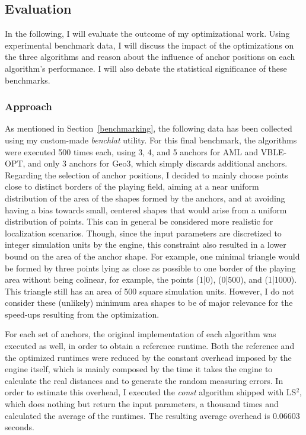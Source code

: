 \subsection{Evaluation}
\label{Evaluation}

In the following, I will evaluate the outcome of my optimizational work. Using experimental benchmark data, I will discuss the impact of the optimizations on the three algorithms and reason about the influence of anchor positions on each algorithm's performance. I will also debate the statistical significance of these benchmarks.

\subsubsection{Approach}
As mentioned in Section~\ref{benchmarking}, the following data has been collected using my custom-made \emph{benchlat} utility. For this final benchmark, the algorithms were executed 500 times each, using 3, 4, and 5 anchors for AML and VBLE-OPT, and only 3 anchors for Geo3, which simply discards additional anchors. Regarding the selection of anchor positions, I decided to mainly choose points close to distinct borders of the playing field, aiming at a near uniform distribution of the area of the shapes formed by the anchors, and at avoiding having a bias towards small, centered shapes that would arise from a uniform distribution of points. This can in general be considered more realistic for localization scenarios. Though, since the input parameters are discretized to integer simulation units by the engine, this constraint also resulted in a lower bound on the area of the anchor shape. For example, one minimal triangle would be formed by three points lying as close as possible to one border of the playing area without being colinear, for example, the points (1|0), (0|500), and (1|1000). This triangle still has an area of 500 square simulation units. However, I do not consider these (unlikely) minimum area shapes to be of major relevance for the speed-ups resulting from the optimization.

For each set of anchors, the original implementation of each algorithm was executed as well, in order to obtain a reference runtime. Both the reference and the optimized runtimes were reduced by the constant overhead imposed by the engine itself, which is mainly composed by the time it takes the engine to calculate the real distances and to generate the random measuring errors. In order to estimate this overhead, I executed the \emph{const} algorithm shipped with LS$^{2}$, which does nothing but return the input parameters, a thousand times and calculated the average of the runtimes. The resulting average overhead is 0.06603 seconds. 

